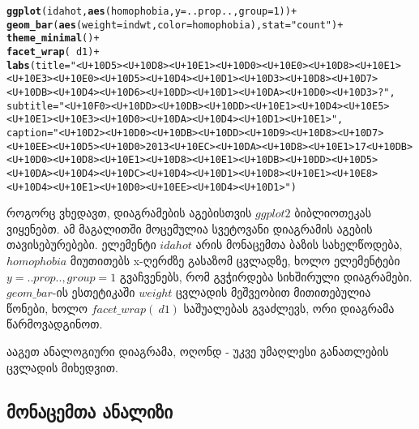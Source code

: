 \documentclass{article}\usepackage[]{graphicx}\usepackage[]{color}
\makeatletter
\newcommand{\hlnum}[1]{\textcolor[rgb]{0.686,0.059,0.569}{#1}}%
\newcommand{\hlstr}[1]{\textcolor[rgb]{0.192,0.494,0.8}{#1}}%
\newcommand{\hlopt}[1]{\textcolor[rgb]{0,0,0}{#1}}%
\newcommand{\hlstd}[1]{\textcolor[rgb]{0.345,0.345,0.345}{#1}}%
\newcommand{\hlkwc}[1]{\textcolor[rgb]{0.333,0.667,0.333}{#1}}%
\newcommand{\hlkwd}[1]{\textcolor[rgb]{0.737,0.353,0.396}{\textbf{#1}}}%
\newenvironment{kframe}{%
 \def\at@end@of@kframe{}%
 \ifinner\ifhmode%
  \def\at@end@of@kframe{\end{minipage}}%
  \begin{minipage}{\columnwidth}%
 \fi\fi%
 \def\FrameCommand##1{\hskip\@totalleftmargin \hskip-\fboxsep
 \colorbox{shadecolor}{##1}\hskip-\fboxsep
     \hskip-\linewidth \hskip-\@totalleftmargin \hskip\columnwidth}%
 \MakeFramed {\advance\hsize-\width
   \@totalleftmargin\z@ \linewidth\hsize
   \@setminipage}}%
 {\par\unskip\endMakeFramed%
 \at@end@of@kframe}
\newenvironment{knitrout}{}{} %
\makeatother
\begin{document}
\begin{knitrout}
\color{fgcolor}\begin{kframe}
\begin{alltt}
\hlkwd{ggplot}\hlstd{(idahot,} \hlkwd{aes}\hlstd{(homophobia,} \hlkwc{y} \hlstd{= ..prop..,} \hlkwc{group} \hlstd{=} \hlnum{1}\hlstd{))}\hlopt{+}
  \hlkwd{geom_bar}\hlstd{(}\hlkwd{aes}\hlstd{(}\hlkwc{weight}\hlstd{=indwt,} \hlkwc{color}\hlstd{=homophobia),} \hlkwc{stat}\hlstd{=}\hlstr{"count"}\hlstd{)}\hlopt{+}
  \hlkwd{theme_minimal}\hlstd{()}\hlopt{+}
  \hlkwd{facet_wrap}\hlstd{(}\hlopt{~}\hlstd{d1)}\hlopt{+}
  \hlkwd{labs}\hlstd{(}\hlkwc{title}\hlstd{=}\hlstr{"<U+10D5><U+10D8><U+10E1> <U+10D0><U+10E0> <U+10D8><U+10E1><U+10E3><U+10E0><U+10D5><U+10D4><U+10D1><U+10D3><U+10D8><U+10D7> <U+10DB><U+10D4><U+10D6><U+10DD><U+10D1><U+10DA><U+10D0><U+10D3>?"}\hlstd{,}
       \hlkwc{subtitle}\hlstd{=}\hlstr{"<U+10F0><U+10DD><U+10DB><U+10DD><U+10E1><U+10D4><U+10E5><U+10E1><U+10E3><U+10D0><U+10DA><U+10D4><U+10D1><U+10E1>"}\hlstd{,}
       \hlkwc{caption}\hlstd{=}\hlstr{"<U+10D2><U+10D0><U+10DB><U+10DD><U+10D9><U+10D8><U+10D7><U+10EE><U+10D5><U+10D0> 2013 <U+10EC><U+10DA><U+10D8><U+10E1> 17 <U+10DB><U+10D0><U+10D8><U+10E1><U+10D8><U+10E1> <U+10DB><U+10DD><U+10D5><U+10DA><U+10D4><U+10DC><U+10D4><U+10D1><U+10D8><U+10E1> <U+10E8><U+10D4><U+10E1><U+10D0><U+10EE><U+10D4><U+10D1>"}\hlstd{)}
\end{alltt}
\end{kframe}
\end{knitrout}

როგორც ვხედავთ, დიაგრამების აგებისთვის $ggplot2$ ბიბლიოთეკას ვიყენებთ. ამ მაგალითში მოცემულია სვეტოვანი დიაგრამის აგების თავისებურებები. ელემენტი $idahot$ არის მონაცემთა ბაზის სახელწოდება, $homophobia$ მიუთითებს x-ღერძზე გასაზომ ცვლადზე, ხოლო ელემენტები $y = ..prop.., group = 1$ გვაჩვენებს, რომ გვჭირდება სიხშირული დიაგრამები. $geom\_bar$-ის ესთეტიკაში $weight$ ცვლადის მეშვეობით მითითებულია წონები, ხოლო $facet\_wrap(~d1)$ საშუალებას გვაძლევს, ორი დიაგრამა წარმოვადგინოთ.

ააგეთ ანალოგიური დიაგრამა, ოღონდ - უკვე უმაღლესი განათლების ცვლადის მიხედვით.

\subsection*{მონაცემთა ანალიზი}
\end{document}
